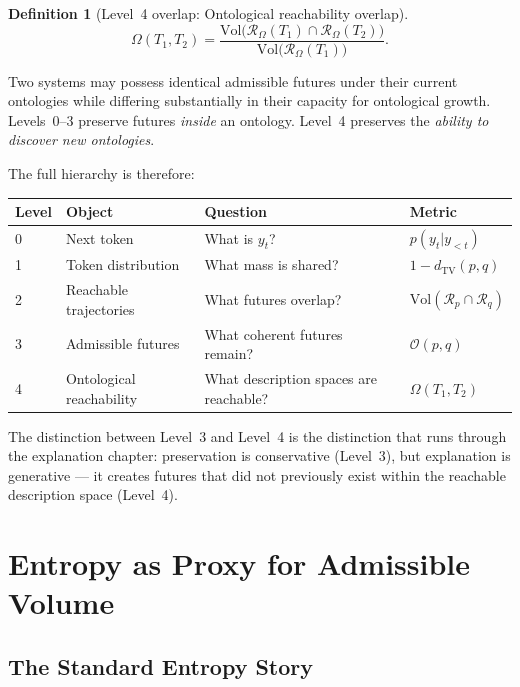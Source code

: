 \documentclass[11pt, a4paper, openany]{book}
\theoremstyle{plain}
\theoremstyle{definition}
\newtheorem{definition}[theorem]{Definition}
\theoremstyle{remark}
\newcommand{\TV}{d_{\mathrm{TV}}}
\newcommand{\Vol}{\mathrm{Vol}}
\begin{document}
\begin{definition}[Level~4 overlap: Ontological reachability overlap]
  \[
    \Omega(T_1, T_2)
    = \frac{\Vol\!\bigl(\mathcal{R}_\Omega(T_1) \cap \mathcal{R}_\Omega(T_2)\bigr)}
           {\Vol\!\bigl(\mathcal{R}_\Omega(T_1)\bigr)}.
  \]
\end{definition}

Two systems may possess identical admissible futures under their current
ontologies while differing substantially in their capacity for ontological
growth.
Levels~0--3 preserve futures \emph{inside} an ontology.
Level~4 preserves the \emph{ability to discover new ontologies}.

The full hierarchy is therefore:

\begin{center}
\begin{tabular}{llll}
\hline
\textbf{Level} & \textbf{Object} & \textbf{Question} & \textbf{Metric} \\
\hline
0 & Next token & What is $y_t$? & $p(y_t | y_{<t})$ \\
1 & Token distribution & What mass is shared? & $1 - \TV(p,q)$ \\
2 & Reachable trajectories & What futures overlap? & $\Vol(\mathcal{R}_p \cap \mathcal{R}_q)$ \\
3 & Admissible futures & What coherent futures remain? & $\mathcal{O}(p,q)$ \\
4 & Ontological reachability & What description spaces are reachable? & $\Omega(T_1,T_2)$ \\
\hline
\end{tabular}
\end{center}

The distinction between Level~3 and Level~4 is the distinction that runs
through the explanation chapter: preservation is conservative (Level~3),
but explanation is generative --- it creates futures that did not previously
exist within the reachable description space (Level~4).

\chapter{Entropy as Proxy for Admissible Volume}
\label{ch:entropy}

\section{The Standard Entropy Story}
\end{document}
